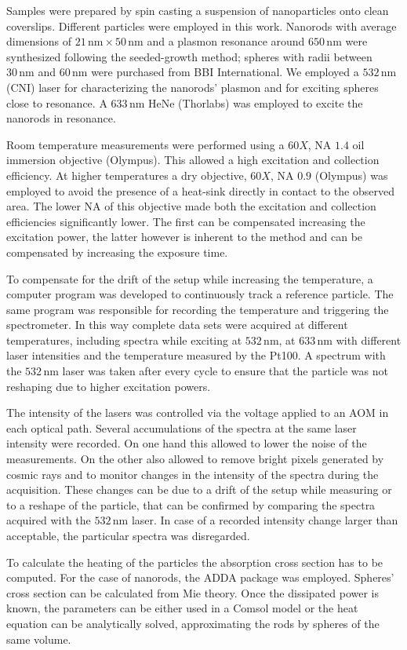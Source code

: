 \documentclass[journal=nalefd,manuscript=letter]{achemso}
\newcommand{\nm}{\ensuremath{\,\textrm{nm}}}
\begin{document}
Samples were prepared by spin casting a suspension of nanoparticles onto clean
coverslips. Different particles were employed in this work. Nanorods with
average dimensions of $21\nm\times50\nm$ and a plasmon resonance around $650\nm$
were synthesized following the seeded-growth method; spheres with radii between
$30\nm$ and $60\nm$ were purchased from BBI International. We employed a
$532\nm$ (CNI) laser for characterizing the nanorods' plasmon and for exciting
spheres close to resonance. A $633\nm$ HeNe (Thorlabs) was employed to excite
the nanorods in resonance.

Room temperature measurements were performed using a $60X$, NA $1.4$ oil
immersion objective (Olympus). This allowed a high excitation and collection
efficiency. At higher temperatures a dry objective, $60X$, NA $0.9$ (Olympus)
was employed to avoid the presence of a heat-sink directly in contact to the
observed area. The lower NA of this objective made both the excitation and
collection efficiencies significantly lower. The first can be compensated
increasing the excitation power, the latter however is inherent to the method
and can be compensated by increasing the exposure time.

To compensate for the drift of the setup while increasing the temperature, a
computer program was developed to continuously track a reference particle. The
same program was responsible for recording the temperature and triggering the
spectrometer. In this way complete data sets were acquired at different
temperatures, including spectra while exciting at $532\nm$, at $633\nm$ with
different laser intensities and the temperature measured by the Pt100. A
spectrum with the $532\nm$ laser was taken after every cycle to ensure that the
particle was not reshaping due to higher excitation powers.

The intensity of the lasers was controlled via the voltage applied to an AOM in
each optical path. Several accumulations of the spectra at the same laser
intensity were recorded. On one hand this allowed to lower the noise of the
measurements. On the other also allowed to remove bright pixels generated by
cosmic rays and to monitor changes in the intensity of the spectra during the
acquisition. These changes can be due to a drift of the setup while measuring or
to a reshape of the particle, that can be confirmed by comparing the spectra
acquired with the $532\nm$ laser. In case of a recorded intensity change larger
than acceptable, the particular spectra was disregarded.

To calculate the heating of the particles the absorption cross section has to be
computed. For the case of nanorods, the ADDA package was employed. Spheres'
cross section can be calculated from Mie theory. Once the dissipated power is
known, the parameters can be either used in a Comsol model or the
heat equation can be analytically solved, approximating the rods by spheres of
the same volume.
\end{document}
